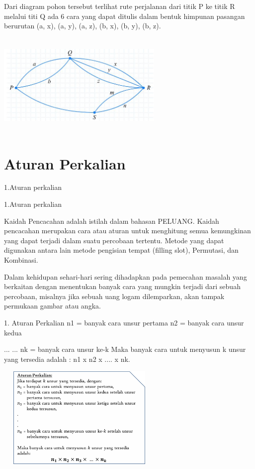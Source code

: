 \documentclass[11pt,fleqn]{book} %
\begin{document}
 Dari diagram pohon tersebut terlihat rute perjalanan dari titik P ke titik R melalui titi Q ada 6 cara yang dapat ditulis dalam bentuk himpunan pasangan berurutan {(a, x), (a, y), (a, z), (b, x), (b, y), (b, z)}.

 
 \includegraphics[width = 8cm, height= 5cm]{Pictures/contoh3b.JPG}
 
 



\section{Aturan Perkalian}

1.Aturan perkalian

1.Aturan perkalian

	Kaidah Pencacahan adalah istilah dalam bahasan PELUANG. Kaidah pencacahan merupakan cara atau aturan untuk menghitung semua kemungkinan yang dapat terjadi dalam suatu percobaan tertentu. Metode yang dapat digunakan antara lain metode pengisian tempat (filling slot), Permutasi, dan Kombinasi. 

	Dalam kehidupan sehari-hari sering dihadapkan pada pemecahan masalah yang berkaitan dengan menentukan banyak cara yang mungkin terjadi dari sebuah percobaan, misalnya jika sebuah uang logam dilemparkan, akan tampak permukaan gambar atau angka. 



1. Aturan Perkalian
n1 = banyak cara unsur pertama
n2 = banyak cara unsur kedua

...
...
nk = banyak cara unsur ke-k
Maka banyak cara untuk menyusun k unsur yang tersedia adalah :
n1 x n2 x .... x nk.



\includegraphics[width = 8cm, height= 5cm]{Pictures/materikaidah1.png}
\end{document}
